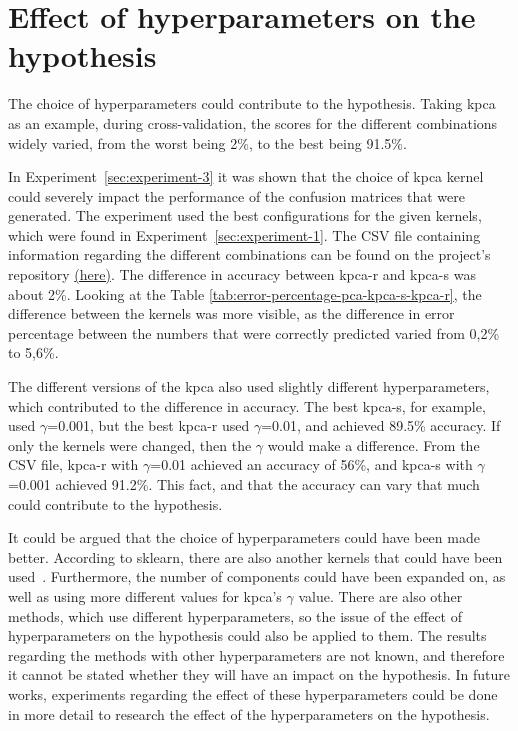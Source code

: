 \section{Effect of hyperparameters on the hypothesis}
The choice of hyperparameters could contribute to the hypothesis. Taking \gls{kpca} as an example, during cross-validation, the scores for the different combinations widely varied, from the worst being 2\%, to the best being 91.5\%.


In Experiment~\ref{sec:experiment-3} it was shown that the choice of \gls{kpca} kernel could severely impact the performance of the confusion matrices that were generated. The experiment used the best configurations for the given kernels, which were found in Experiment~\ref{sec:experiment-1}. The CSV file containing information regarding the different combinations can be found on the project's repository \href{https://github.com/AAU-Dat/P5-Nonlinear-Dimensionality-Reduction/blob/main/src/results/experiment_one/cross_validation_kernel_pca_svm_15000%20(1).csv}{(here)}. The difference in accuracy between \gls{kpca-r} and \gls{kpca-s} was about 2\%. Looking at the Table \ref{tab:error-percentage-pca-kpca-s-kpca-r}, the difference between the kernels was more visible, as the difference in error percentage between the numbers that were correctly predicted varied from 0,2\% to 5,6\%. 


The different versions of the \gls{kpca} also used slightly different hyperparameters, which contributed to the difference in accuracy. The best \gls{kpca-s}, for example, used $\gamma$=0.001, but the best \gls{kpca-r} used $\gamma$=0.01, and achieved 89.5\% accuracy. If only the kernels were changed, then the $\gamma$ would make a difference. From the CSV file, \gls{kpca-r} with $\gamma$=0.01 achieved an accuracy of 56\%, and \gls{kpca-s} with $\gamma$=0.001 achieved 91.2\%. This fact, and that the accuracy can vary that much could contribute to the hypothesis.


It could be argued that the choice of hyperparameters could have been made better. According to \gls{sklearn}, there are also another kernels that could have been used~\cite{scikit-learn}. Furthermore, the number of components could have been expanded on, as well as using more different values for \gls{kpca}'s $\gamma$ value. There are also other methods, which use different hyperparameters, so the issue of the effect of hyperparameters on the hypothesis could also be applied to them. The results regarding the methods with other hyperparameters are not known, and therefore it cannot be stated whether they will have an impact on the hypothesis. In future works, experiments regarding the effect of these hyperparameters could be done in more detail to research the effect of the hyperparameters on the hypothesis.
